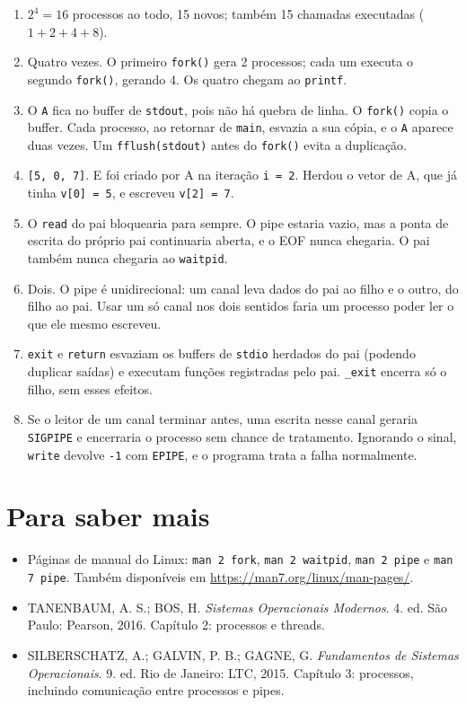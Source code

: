 \documentclass[11pt,a4paper]{article}
\newcommand{\cmd}[1]{\texttt{#1}}
\begin{document}
\begin{enumerate}
    \item $2^4 = 16$ processos ao todo, 15 novos; também 15 chamadas executadas ($1 + 2 + 4 + 8$).
    \item Quatro vezes. O primeiro \cmd{fork()} gera 2 processos; cada um executa o segundo \cmd{fork()}, gerando 4. Os quatro chegam ao \cmd{printf}.
    \item O \cmd{A} fica no buffer de \cmd{stdout}, pois não há quebra de linha. O \cmd{fork()} copia o buffer. Cada processo, ao retornar de \cmd{main}, esvazia a sua cópia, e o \cmd{A} aparece duas vezes. Um \cmd{fflush(stdout)} antes do \cmd{fork()} evita a duplicação.
    \item \cmd{[5, 0, 7]}. E foi criado por A na iteração \cmd{i = 2}. Herdou o vetor de A, que já tinha \cmd{v[0] = 5}, e escreveu \cmd{v[2] = 7}.
    \item O \cmd{read} do pai bloquearia para sempre. O pipe estaria vazio, mas a ponta de escrita do próprio pai continuaria aberta, e o EOF nunca chegaria. O pai também nunca chegaria ao \cmd{waitpid}.
    \item Dois. O pipe é unidirecional: um canal leva dados do pai ao filho e o outro, do filho ao pai. Usar um só canal nos dois sentidos faria um processo poder ler o que ele mesmo escreveu.
    \item \cmd{exit} e \cmd{return} esvaziam os buffers de \cmd{stdio} herdados do pai (podendo duplicar saídas) e executam funções registradas pelo pai. \cmd{\_exit} encerra só o filho, sem esses efeitos.
    \item Se o leitor de um canal terminar antes, uma escrita nesse canal geraria \cmd{SIGPIPE} e encerraria o processo sem chance de tratamento. Ignorando o sinal, \cmd{write} devolve \cmd{-1} com \cmd{EPIPE}, e o programa trata a falha normalmente.
\end{enumerate}

\section*{Para saber mais}

\begin{itemize}
    \item Páginas de manual do Linux: \cmd{man 2 fork}, \cmd{man 2 waitpid}, \cmd{man 2 pipe} e \cmd{man 7 pipe}. Também disponíveis em \url{https://man7.org/linux/man-pages/}.
    \item TANENBAUM, A. S.; BOS, H. \emph{Sistemas Operacionais Modernos}. 4. ed. São Paulo: Pearson, 2016. Capítulo 2: processos e threads.
    \item SILBERSCHATZ, A.; GALVIN, P. B.; GAGNE, G. \emph{Fundamentos de Sistemas Operacionais}. 9. ed. Rio de Janeiro: LTC, 2015. Capítulo 3: processos, incluindo comunicação entre processos e pipes.
\end{itemize}
\end{document}
